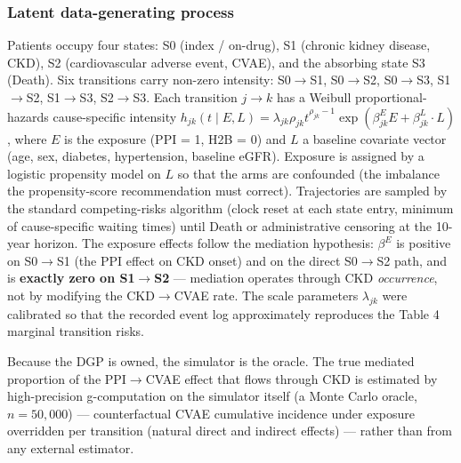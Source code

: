 \documentclass[sn-vancouver-num]{sn-jnl}
\begin{document}
\subsubsection{Latent data-generating process}
Patients occupy four states: S0 (index / on-drug), S1 (chronic kidney disease, CKD), S2 (cardiovascular adverse event, CVAE), and the absorbing state S3 (Death). Six transitions carry non-zero intensity: S0$\rightarrow$S1, S0$\rightarrow$S2, S0$\rightarrow$S3, S1$\rightarrow$S2, S1$\rightarrow$S3, S2$\rightarrow$S3. Each transition $j\rightarrow k$ has a Weibull proportional-hazards cause-specific intensity $h_{jk}(t \mid E, L) = \lambda_{jk} \rho_{jk} t^{\rho_{jk} - 1} \exp(\beta^E_{jk} E + \beta^L_{jk} \cdot L)$, where $E$ is the exposure (PPI = 1, H2B = 0) and $L$ a baseline covariate vector (age, sex, diabetes, hypertension, baseline eGFR). Exposure is assigned by a logistic propensity model on $L$ so that the arms are confounded (the imbalance the propensity-score recommendation must correct). Trajectories are sampled by the standard competing-risks algorithm (clock reset at each state entry, minimum of cause-specific waiting times) until Death or administrative censoring at the 10-year horizon. The exposure effects follow the mediation hypothesis: $\beta^E$ is positive on S0$\rightarrow$S1 (the PPI effect on CKD onset) and on the direct S0$\rightarrow$S2 path, and is \textbf{exactly zero on S1$\rightarrow$S2} --- mediation operates through CKD \textit{occurrence}, not by modifying the CKD$\rightarrow$CVAE rate. The scale parameters $\lambda_{jk}$ were calibrated so that the recorded event log approximately reproduces the Table 4 marginal transition risks.

Because the DGP is owned, the simulator is the oracle. The true mediated proportion of the PPI$\rightarrow$CVAE effect that flows through CKD is estimated by high-precision g-computation on the simulator itself (a Monte Carlo oracle, $n = 50{,}000$) --- counterfactual CVAE cumulative incidence under exposure overridden per transition (natural direct and indirect effects) --- rather than from any external estimator.
\end{document}
